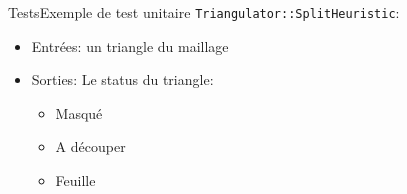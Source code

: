 


  \begin{frame}{Tests}{Exemple de test unitaire}
    \texttt{Triangulator::SplitHeuristic}:
    \begin{itemize}
      \item Entrées: un triangle du maillage
      \item Sorties: Le status du triangle:
        \begin{itemize}
          \item Masqué
          \item A découper
          \item Feuille
        \end{itemize}
    \end{itemize}
  \end{frame}


